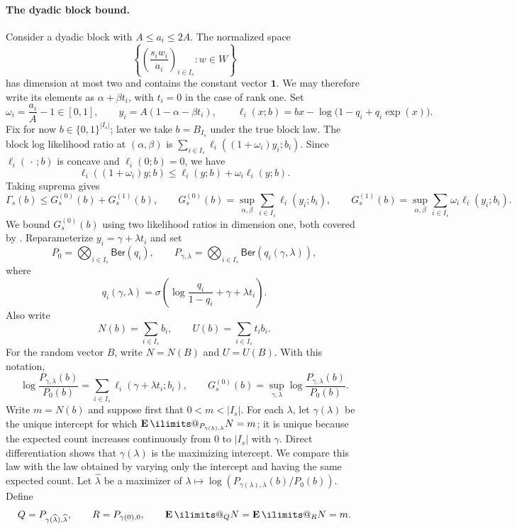 \documentclass[11pt, letterpaper, hidelinks]{article}
\makeatletter
\renewcommand{\proofname}{\textit{\textbf{Proof}}}
\renewenvironment{proof}[1][\proofname]{\par\pushQED{\qed}\normalfont \topsep6\p@\@plus6\p@\relax\trivlist\item[\hskip\labelsep#1\@addpunct{}]\ignorespaces}{\popQED\endtrivlist\@endpefalse}
\newcommand{\proofsketchname}{\textit{\textbf{Proof sketch}}}
\newenvironment{proofsketch}
  {\begin{proof}[\proofsketchname]}
  {\end{proof}}
\newcommand{\1}{\mathbf 1}
\renewcommand{\leq}{\leqslant}
\newcommand{\E}{\operatorname*{\mathbf{E}}\ilimits@}
\theoremstyle{plain}
\theoremstyle{definition}
\newcommand{\Ber}[1]{\mathsf{Ber}\left(#1\right)}
\makeatother
\begin{document}
\begin{proofsketch}
\paragraph{The dyadic block bound.}
Consider a dyadic block with $A\leq a_i\leq2A$.  The normalized space
\[
\left\{\left(\frac{s_iw_i}{a_i}\right)_{i\in I_s}:w\in W\right\}
\]
has dimension at most two and contains the constant vector $\1$.  We may
therefore write its elements as $\alpha+\beta t_i$, with $t_i=0$ in the case
of rank one.  Set
\[
\omega_i=\frac{a_i}{A}-1\in[0,1],
\qquad y_i=A(1-\alpha-\beta t_i),
\qquad
\ell_i(x;b)=bx-\log\bigl(1-q_i+q_i\exp(x)\bigr).
\]
Fix for now $b\in\{0,1\}^{|I_s|}$; later we take $b=B_{I_s}$ under the true
block law.  The block log likelihood ratio at $(\alpha,\beta)$ is
$\sum_{i\in I_s}\ell_i((1+\omega_i)y_i;b_i)$.  Since
$\ell_i(\,\cdot\,;b)$ is concave and $\ell_i(0;b)=0$, we have
\[
\ell_i((1+\omega_i)y;b)
\leq \ell_i(y;b)+\omega_i\ell_i(y;b).
\]
Taking suprema gives
\[
\Gamma_s(b)\leq G_s^{(0)}(b)+G_s^{(1)}(b),\qquad
G_s^{(0)}(b)=\sup_{\alpha,\beta}\sum_{i\in I_s}\ell_i(y_i;b_i),\qquad
G_s^{(1)}(b)=\sup_{\alpha,\beta}\sum_{i\in I_s}
\omega_i\ell_i(y_i;b_i).
\]
We bound $G_s^{(0)}(b)$ using two likelihood ratios in dimension one, both
covered by .  Reparameterize $y_i=\gamma+\lambda t_i$ and set
\[
P_0=\bigotimes_{i\in I_s}\Ber{q_i},
\qquad
P_{\gamma,\lambda}=\bigotimes_{i\in I_s}\Ber{q_i(\gamma,\lambda)},
\]
where
\[
q_i(\gamma,\lambda)=\sigma\left(\log\frac{q_i}{1-q_i}
+\gamma+\lambda t_i\right).
\]
Also write
\[
N(b)=\sum_{i\in I_s}b_i,
\qquad
U(b)=\sum_{i\in I_s}t_i b_i.
\]
For the random vector $B$, write $N=N(B)$ and $U=U(B)$.
With this notation,
\[
\log\frac{P_{\gamma,\lambda}(b)}{P_0(b)}
=\sum_{i\in I_s}\ell_i(\gamma+\lambda t_i;b_i),
\qquad
G_s^{(0)}(b)=\sup_{\gamma,\lambda}
\log\frac{P_{\gamma,\lambda}(b)}{P_0(b)}.
\]
Write $m=N(b)$ and suppose first that $0<m<|I_s|$.  For each
$\lambda$, let $\gamma(\lambda)$ be the unique intercept for which
$\E_{P_{\gamma(\lambda),\lambda}}N=m$; it is unique because the expected count
increases continuously from $0$ to $|I_s|$ with $\gamma$.  Direct
differentiation shows that $\gamma(\lambda)$ is the maximizing intercept.  We compare this law
with the law obtained by varying only the intercept and having the same
expected count.  Let
$\widehat\lambda$ be a maximizer of $\lambda\mapsto
\log(P_{\gamma(\lambda),\lambda}(b)/P_0(b))$.  Define
\[
\begin{gathered}
Q=P_{\gamma(\widehat\lambda),\widehat\lambda},
\qquad
R=P_{\gamma(0),0},
\qquad
\E_QN=\E_RN=m.
\end{gathered}
\]
\end{proofsketch}
\end{document}
